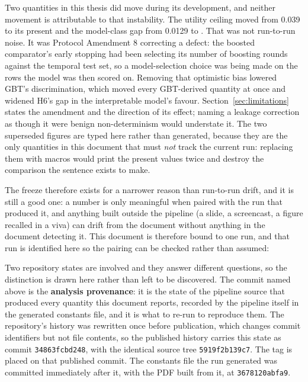 Two quantities in this thesis did move during its development, and neither
movement is attributable to that instability. The utility ceiling moved from
0.039 to its present \pcUtilityMaxGbtB{} and the model-class gap from 0.0129 to
\pcHSixAbsEst. That was not run-to-run noise. It was Protocol Amendment 8
correcting a defect: the boosted comparator's early stopping had been selecting
its number of boosting rounds against the temporal test set, so a
model-selection choice was being made on the rows the model was then scored on.
Removing that optimistic bias lowered GBT's discrimination, which moved every
GBT-derived quantity at once and widened H6's gap in the interpretable model's
favour. Section~\ref{sec:limitations} states the amendment and the direction of
its effect; naming a leakage correction as though it were benign
non-determinism would understate it. The two superseded figures are typed here
rather than generated, because they are the only quantities in this document
that must \emph{not} track the current run: replacing them with macros would
print the present values twice and destroy the comparison the sentence exists to
make.

The freeze therefore exists for a narrower reason than run-to-run drift, and it
is still a good one: a number is only meaningful when paired with the run that
produced it, and anything built outside the pipeline (a slide, a screencast, a
figure recalled in a viva) can drift from the document without anything in the
document detecting it. This document is therefore bound to one run, and that run is
identified here so the pairing can be checked rather than assumed:

\begin{center}
\end{center}

Two repository states are involved and they answer different questions, so the
distinction is drawn here rather than left to be discovered. The commit named
above is the \textbf{analysis provenance}: it is the state of the pipeline
source that produced every quantity this document reports, recorded by the
pipeline itself in the generated constants file, and it is what to re-run to
reproduce them. The repository's history was rewritten once before
publication, which changes commit identifiers but not file contents, so the
published history carries this state as commit \texttt{34863fcbd248}, with the
identical source tree \texttt{5919f2b139c7}. The tag \texttt{\pcFrozenTag} is
placed on that published commit. The constants file the run generated was
committed immediately after it, with the PDF built from it, at
\texttt{3678120abfa9}.

